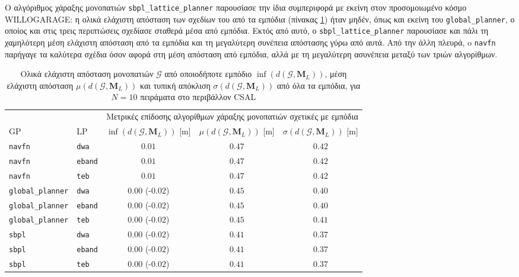 Ο αλγόριθμος χάραξης μονοπατιών \texttt{sbpl\_lattice\_planner} παρουσίασε την
ίδια συμπεριφορά με εκείνη στον προσομοιωμένο κόσμο WILLOGARAGE: η ολικά
ελάχιστη απόσταση των σχεδίων του από τα εμπόδια (πίνακας
\ref{tbl:info_global_plan_map_csal}) ήταν μηδέν, όπως και εκείνη του
\texttt{global\_planner}, ο οποίος και στις τρεις περιπτώσεις σχεδίασε σταθερά
μέσα από εμπόδια. Εκτός από αυτό, ο \texttt{sbpl\_lattice\_planner} παρουσίασε
και πάλι τη χαμηλότερη μέση ελάχιστη απόσταση από τα εμπόδια και τη μεγαλύτερη
συνέπεια απόστασης γύρω από αυτά. Από την άλλη πλευρά, o \texttt{navfn}
παρήγαγε τα καλύτερα σχέδια όσον αφορά στη μέση απόσταση από εμπόδια, αλλά με τη
μεγαλύτερη ασυνέπεια μεταξύ των τριών αλγορίθμων.

\begin{table}[h]\hspace{-1cm}
\renewcommand{\arraystretch}{1.3}
\begin{tabular}{llccc}
  & & \multicolumn{3}{c}{Μετρικές επίδοσης αλγορίθμων χάραξης μονοπατιών σχετικές με εμπόδια} \\
  \cline{3-5}
  GP & LP & $\inf(d(\bm{\mathcal{G}},\bm{M}_L))$ [m] & $\mu(d(\bm{\mathcal{G}}, \bm{M}_L))$ [m] & $\sigma(d(\bm{\mathcal{G}},\bm{M}_L))$ [m] \\ \toprule
  \texttt{navfn} & \texttt{dwa} & $0.01$ & $0.47$ & $0.42$ \\
  \texttt{navfn} & \texttt{eband} & $0.01$ & $0.47$ & $0.42$ \\
  \texttt{navfn} & \texttt{teb} & $0.01$ & $0.47$ & $0.42$ \\
  \texttt{global\_planner} & \texttt{dwa} & \hspace{1.1cm} $0.00$ (-$0.02$) & $0.45$ & $0.40$ \\
  \texttt{global\_planner} & \texttt{eband} & \hspace{1.1cm} $0.00$ (-$0.02$) & $0.45$ & $0.40$ \\
  \texttt{global\_planner} & \texttt{teb} & \hspace{1.1cm} $0.00$ (-$0.02$) & $0.45$ & $0.41$ \\
  \texttt{sbpl} & \texttt{dwa} & \hspace{1.1cm} $0.00$ (-$0.02$) & $0.41$ & $0.37$ \\
  \texttt{sbpl} & \texttt{eband} & \hspace{1.1cm} $0.00$ (-$0.02$) & $0.41$ & $0.37$ \\
  \texttt{sbpl} & \texttt{teb} & \hspace{1.1cm} $0.00$ (-$0.02$) & $0.41$ & $0.37$ \\ \bottomrule
\end{tabular}
\caption{\small Ολικά ελάχιστη απόσταση μονοπατιών $\bm{\mathcal{G}}$ από
         οποιοδήποτε εμπόδιο $\inf(d(\bm{\mathcal{G}},\bm{M}_L))$, μέση
         ελάχιστη απόσταση $\mu(d(\bm{\mathcal{G}},\bm{M}_L))$ και τυπική
         απόκλιση $\sigma(d(\bm{\mathcal{G}},\bm{M}_L))$ από όλα τα εμπόδια,
         για $N=10$ πειράματα στο περιβάλλον CSAL}
\label{tbl:info_global_plan_map_csal}
\end{table}


